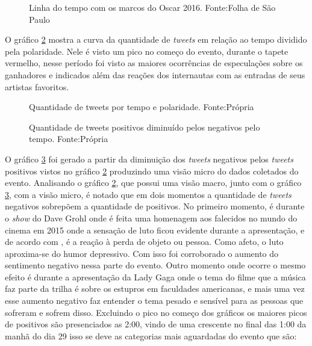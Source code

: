 \begin{figure}[!h]
	\centering{}
	\caption{Linha do tempo com os marcos do Oscar 2016. Fonte:Folha de São Paulo}
	\label{time}
\end{figure}
O gráfico \ref{qtd} mostra a curva da quantidade de \textit{tweets} em relação ao tempo  dividido pela polaridade. Nele é visto um pico  no começo do evento, durante o tapete vermelho, nesse período foi visto as maiores ocorrências de especulações sobre os ganhadores e indicados além das reações dos internautas com as entradas de seus artistas favoritos.

\begin{figure}[!h]
	\centering{}
	\caption{Quantidade de tweets por tempo e polaridade. Fonte:Própria}
	\label{qtd}
\end{figure}

\begin{figure}[!h]
	\centering{}
	\caption{Quantidade de tweets positivos diminuído pelos negativos pelo tempo. Fonte:Própria}
	\label{qtdnegpos}
\end{figure}

O gráfico \ref{qtdnegpos} foi gerado a partir da diminuição dos \textit{tweets} negativos pelos \textit{tweets} positivos vistos no gráfico \ref{qtd} produzindo uma visão micro do dados coletados do evento. Analisando o gráfico \ref{qtd}, que possui uma visão macro, junto com o gráfico \ref{qtdnegpos}, com a visão micro, é notado que em dois momentos a quantidade de \textit{tweets} negativos sobrepõem a quantidade de positivos. No primeiro momento, é durante o \textit{show} do Dave Grohl onde é feita uma homenagem aos falecidos no mundo do cinema em 2015 onde a sensação de luto ficou evidente durante a apresentação, e de acordo com \cite{freud1908conferencias}, é a reação à perda de objeto ou pessoa. Como afeto, o luto aproxima-se do humor depressivo. Com isso foi corroborado o aumento do sentimento negativo nessa parte do evento. Outro momento onde ocorre o mesmo efeito é durante a apresentação da Lady Gaga onde o tema do filme que a  música faz parte da trilha é sobre os estupros em faculdades americanas, e mais uma vez esse aumento negativo faz entender o tema pesado e sensível para as pessoas que sofreram e sofrem disso. Excluindo o pico no começo dos gráficos os maiores picos de positivos são presenciados as 2:00, vindo de uma crescente no final das 1:00 da manhã do dia 29 isso se deve as categorias mais aguardadas do evento que são:

